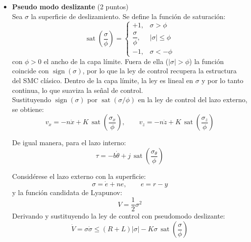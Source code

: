 \begin{enumerate}
\begin{itemize}
        \item \textbf{Pseudo modo deslizante} (2 puntos)\\

        Sea $\sigma$ la superficie de deslizamiento. Se define la función de saturación:
        \begin{equation*}
            \operatorname{sat}\!\left(\frac{\sigma}{\phi}\right) = \begin{cases}
                +1, & \sigma > \phi \\[2pt]
                \dfrac{\sigma}{\phi}, & |\sigma| \le \phi \\[2pt]
                -1, & \sigma < -\phi
            \end{cases}
        \end{equation*}
        con $\phi>0$ el ancho de la capa límite. Fuera de ella ($|\sigma|>\phi$) la función coincide con $\operatorname{sign}(\sigma)$, por lo que la ley de control recupera la estructura del SMC clásico. Dentro de la capa límite, la ley es lineal en $\sigma$ y por lo tanto continua, lo que suaviza la señal de control.\\

        Sustituyendo $\operatorname{sign}(\sigma)$ por $\operatorname{sat}(\sigma/\phi)$ en la ley de control del lazo externo, se obtiene:
        \begin{equation*}
            v_x = -n\dot{x} + K\,\operatorname{sat}\!\left(\frac{\sigma_x}{\phi}\right),\qquad
            v_z = -n\dot{z} + K\,\operatorname{sat}\!\left(\frac{\sigma_z}{\phi}\right)
        \end{equation*}

        De igual manera, para el lazo interno:
        \begin{equation*}
            \tau = -b\dot{\theta} + j\,\operatorname{sat}\!\left(\frac{\sigma_\theta}{\phi}\right)
        \end{equation*}

        Considérese el lazo externo con la superficie:
        \begin{equation*}
            \sigma = \dot{e} + n e,\qquad e = r - y
        \end{equation*}
        y la función candidata de Lyapunov:
        \begin{equation*}
            V = \frac{1}{2}\sigma^2
        \end{equation*}
        Derivando y sustituyendo la ley de control con pseudomodo deslizante:
        \begin{equation*}
            \dot{V} = \sigma\dot{\sigma} \le (R+L)|\sigma| - K\sigma\,\operatorname{sat}\!\left(\frac{\sigma}{\phi}\right)
        \end{equation*}


\end{itemize}
\end{enumerate}

